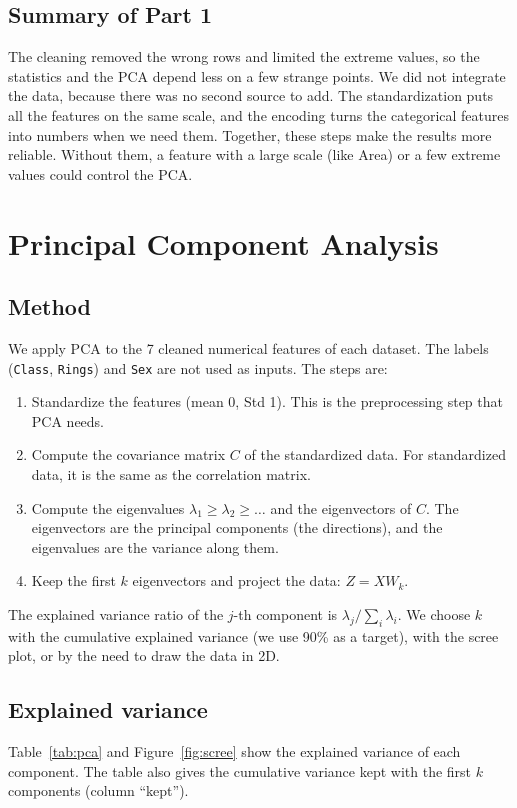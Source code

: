 \documentclass[11pt,a4paper]{article}
\begin{document}
\subsection{Summary of Part 1}
The cleaning removed the wrong rows and limited the extreme values, so the statistics and the PCA depend less on a few strange points. We did not integrate the data, because there was no second source to add. The standardization puts all the features on the same scale, and the encoding turns the categorical features into numbers when we need them. Together, these steps make the results more reliable. Without them, a feature with a large scale (like Area) or a few extreme values could control the PCA.

\section{Principal Component Analysis}
\subsection{Method}
We apply PCA to the 7 cleaned numerical features of each dataset. The labels (\texttt{Class}, \texttt{Rings}) and \texttt{Sex} are not used as inputs. The steps are:
\begin{enumerate}
  \item Standardize the features (mean 0, Std 1). This is the preprocessing step that PCA needs.
  \item Compute the covariance matrix $C$ of the standardized data. For standardized data, it is the same as the correlation matrix.
  \item Compute the eigenvalues $\lambda_1\ge\lambda_2\ge\dots$ and the eigenvectors of $C$. The eigenvectors are the principal components (the directions), and the eigenvalues are the variance along them.
  \item Keep the first $k$ eigenvectors and project the data: $Z = X W_k$.
\end{enumerate}
The explained variance ratio of the $j$-th component is $\lambda_j / \sum_i \lambda_i$. We choose $k$ with the cumulative explained variance (we use 90\% as a target), with the scree plot, or by the need to draw the data in 2D.

\subsection{Explained variance}
Table~\ref{tab:pca} and Figure~\ref{fig:scree} show the explained variance of each component. The table also gives the cumulative variance kept with the first $k$ components (column ``kept'').
\end{document}
